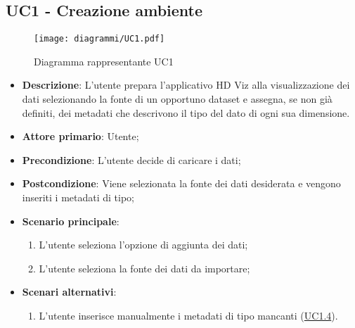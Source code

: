 \subsection{UC1 - Creazione ambiente}
\label{sub:uc1}


\begin{figure}[h]
    \centering
    \texttt{[image: diagrammi/UC1.pdf]}
    \caption{Diagramma rappresentante UC1}
    \label{fig:UC1}
\end{figure}


\begin{itemize}
    \item \textbf{Descrizione}: L'utente prepara l'applicativo HD Viz alla visualizzazione dei dati selezionando la fonte di un opportuno dataset e assegna, se non già definiti, dei metadati che descrivono il tipo del dato di ogni sua dimensione.
	
    \item \textbf{Attore primario}: Utente;
        
    \item \textbf{Precondizione}:   L'utente decide di caricare i dati;

    \item \textbf{Postcondizione}:  Viene selezionata la fonte dei dati desiderata e vengono inseriti i metadati di tipo;

	\item \textbf{Scenario principale}:
		\begin{enumerate}
			\item L'utente seleziona l'opzione di aggiunta dei dati;
            \item L'utente seleziona la fonte dei dati da importare;
        \end{enumerate}
   
    \item \textbf{Scenari alternativi}:
            \begin{enumerate}
                \item L'utente inserisce manualmente i metadati di tipo mancanti (\hyperref[ssub:uc1.4]{UC1.4}).
			\end{enumerate}
\end{itemize}

